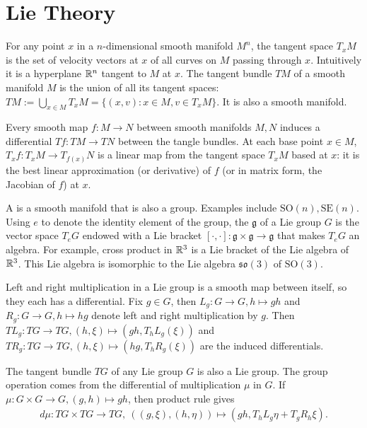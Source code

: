 \documentclass[12pt,class=article,crop=false]{standalone}
\begin{document}
\section{Lie Theory}

For any point $ x$ in a $ n$-dimensional smooth manifold  $ M^{n}$, the tangent space  $ T_xM$ is the set of velocity vectors at $ x$ of all curves on $ M$ passing through $ x$. Intuitively it is a hyperplane $ \mathbb{R}^{n}$ tangent to $ M$ at  $ x$. The tangent bundle $ TM$ of a smooth manifold $ M$ is the union of all its tangent spaces: $ TM := \bigcup_{ x \in M} T_x M = \{(x,v): x \in M, v \in T_xM\}  $. It is also a smooth manifold.

Every smooth map $ f:M \to N$ between smooth manifolds $ M,N$ induces a differential  $ Tf: TM \to TN$ between the tangle bundles. At each base point $ x \in M$, $ T_x f : T_xM \to T_{f(x)} N$ is a linear map from the tangent space $ T_xM$ based at $ x$: it is the best linear approximation (or derivative) of $ f$ (or in matrix form, the Jacobian of $ f$) at  $ x$.
 

A  is a smooth manifold that is also a group. Examples include $ \text{SO}( n), \text{SE}( n)$. Using $ e$ to denote the identity element of the group, the  $ \mathfrak{ g}$ of a Lie group $ G$ is the vector space $ T_e G$ endowed with a Lie bracket $ [ \cdot , \cdot ] : \mathfrak{ g} \times \mathfrak{ g} \to \mathfrak{ g}$ that makes $ T_eG$ an algebra.  For example, cross product in $ \mathbb{R}^3$ is a Lie bracket of the Lie algebra of $ \mathbb{R}^3$. This Lie algebra is isomorphic to the Lie algebra $ \mathfrak{ so}(3)$ of $ \text{SO}(3) $.

Left and right multiplication in a Lie group is a smooth map between itself, so they each has a differential. Fix $ g \in G$, then $ L_g : G \to G, h \mapsto gh$ and  $ R_g : G \to G, h \mapsto hg$ denote left and right multiplication by $ g$. Then $ TL_g: TG \to TG, (h, \xi) \mapsto (gh, T_hL_g (\xi))$ and $ TR_g: TG \to TG, (h, \xi) \mapsto (hg, T_h R_g(\xi))$ are the induced differentials.

The tangent bundle $ TG$ of any Lie group $ G$ is also a Lie group. The group operation comes from the differential of multiplication $ \mu$ in  $ G$. If $ \mu: G \times G \to G, (g,h) \mapsto gh$, then product rule gives
\begin{align*}
	d\mu : TG \times TG \to TG,\ ((g, \xi) , (h, \eta)) \mapsto (gh, T_hL_g \eta + T_g R_h \xi).
\end{align*}
\end{document}
